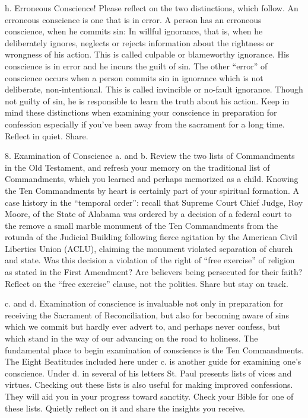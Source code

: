 \documentclass[oneside]{book}
\begin{document}
h. Erroneous Conscience! Please reflect on the two distinctions, which
follow. An erroneous conscience is one that is in error. A person has an
erroneous conscience, when he commits sin:
In willful ignorance, that is, when he deliberately ignores, neglects or rejects
information about the rightness or wrongness of his action. This is called
culpable or blameworthy ignorance. His conscience is in error and he incurs the
guilt of sin.
The other ``error'' of conscience occurs when a person commits sin in ignorance
which is not deliberate, non-intentional. This is called invincible or no-fault
ignorance. Though not guilty of sin, he is responsible to learn the truth about
his action.
Keep in mind these distinctions when examining your conscience in preparation
for confession especially if you've been away from the sacrament for a long
time. Reflect in quiet. Share.

8. Examination of Conscience
a. and b. Review the two lists of Commandments in the Old Testament, and refresh
your memory on the traditional list of Commandments, which you learned and
perhaps memorized as a child. Knowing the Ten Commandments by heart is certainly
part of your spiritual formation.
A case history in the ``temporal order'': recall that Supreme Court Chief Judge,
Roy Moore, of the State of Alabama was ordered by a decision of a federal court
to the remove a small marble monument of the Ten Commandments from the rotunda
of the Judicial Building following fierce agitation by the American Civil
Liberties Union (ACLU), claiming the monument violated separation of church and
state. Was this decision a violation of the right of ``free exercise'' of
religion as stated in the First Amendment? Are believers being persecuted for
their faith? Reflect on the ``free exercise'' clause, not the politics. Share
but stay on track.

c. and d. Examination of conscience is invaluable not only in preparation for
receiving the Sacrament of Reconciliation, but also for becoming aware of sins
which we commit but hardly ever advert to, and perhaps never confess, but which
stand in the way of our advancing on the road to holiness.
The fundamental place to begin examination of conscience is the Ten
Commandments. The Eight Beatitudes included here under c. is another guide for
examining one's conscience. Under d. in several of his letters St. Paul presents
lists of vices and virtues. Checking out these lists is also useful for making
improved confessions. They will aid you in your progress toward sanctity. Check
your Bible for one of these lists. Quietly reflect on it and share the insights
you receive.
\end{document}
